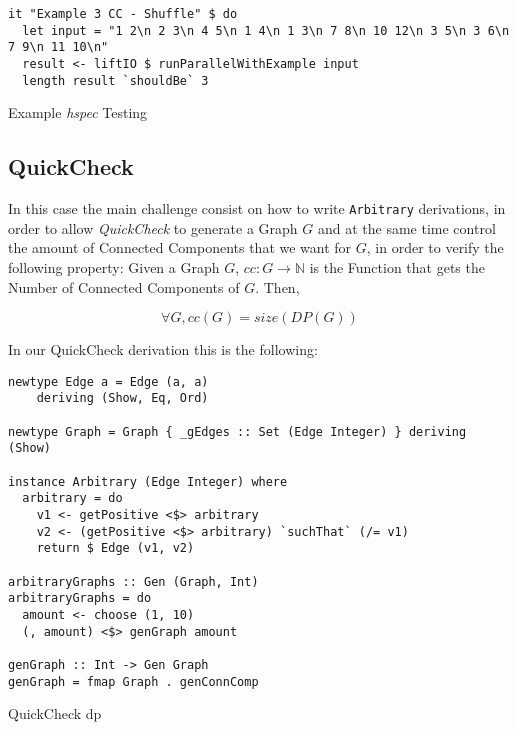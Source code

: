 \documentclass[preprint]{elsarticle}
\begin{document}
\begin{listing}[H]
\begin{verbatim}      
it "Example 3 CC - Shuffle" $ do
  let input = "1 2\n 2 3\n 4 5\n 1 4\n 1 3\n 7 8\n 10 12\n 3 5\n 3 6\n 7 9\n 11 10\n"
  result <- liftIO $ runParallelWithExample input
  length result `shouldBe` 3
\end{verbatim}
\caption{Example \textit{hspec} Testing}
\label{src:haskell:6}
\end{listing}

\subsection{QuickCheck}
In this case the main challenge consist on how to write \texttt{Arbitrary} derivations, in order to 
allow \textit{QuickCheck} to generate a Graph $G$ and at the same time control the amount of Connected Components that we want for $G$, 
in order to verify the following property: Given a Graph $G$, $cc : G \to \mathbb{N}$ is the Function that gets the Number of Connected Components of $G$.
Then,

\begin{equation}
  \forall G, cc(G) = size(DP(G))
\end{equation}

In our QuickCheck derivation this is the following:

\begin{listing}[H]
  \begin{verbatim}      
newtype Edge a = Edge (a, a)
    deriving (Show, Eq, Ord)
  
newtype Graph = Graph { _gEdges :: Set (Edge Integer) } deriving (Show)
  
instance Arbitrary (Edge Integer) where
  arbitrary = do
    v1 <- getPositive <$> arbitrary
    v2 <- (getPositive <$> arbitrary) `suchThat` (/= v1)
    return $ Edge (v1, v2)
  
arbitraryGraphs :: Gen (Graph, Int)
arbitraryGraphs = do
  amount <- choose (1, 10)
  (, amount) <$> genGraph amount
  
genGraph :: Int -> Gen Graph
genGraph = fmap Graph . genConnComp
\end{verbatim}
\caption{QuickCheck \acrshort{dp}}
\label{src:haskell:7}
\end{listing}
\end{document}
